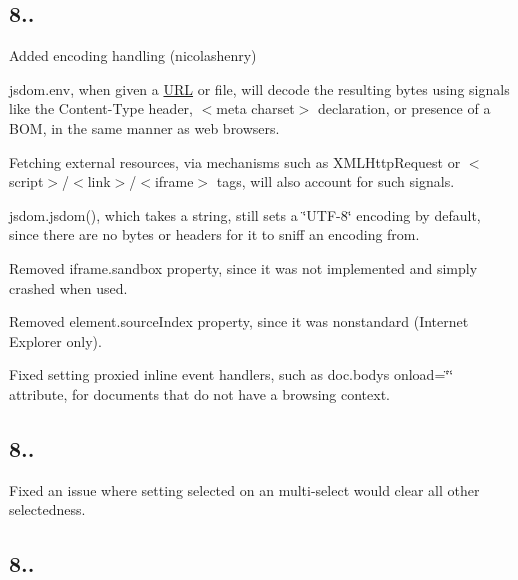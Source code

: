 \subsection*{8..}


\begin{DoxyItemize}
\item Added encoding handling (nicolashenry)
\begin{DoxyItemize}
\item {\ttfamily jsdom.\+env}, when given a \mbox{\hyperlink{namespace_u_r_l}{U\+RL}} or file, will decode the resulting bytes using signals like the {\ttfamily Content-\/\+Type} header, {\ttfamily $<$meta charset$>$} declaration, or presence of a B\+OM, in the same manner as web browsers.
\item Fetching external resources, via mechanisms such as X\+M\+L\+Http\+Request or {\ttfamily $<$script$>$}/{\ttfamily $<$link$>$}/{\ttfamily $<$iframe$>$} tags, will also account for such signals.
\item {\ttfamily jsdom.\+jsdom()}, which takes a string, still sets a \char`\"{}\+U\+T\+F-\/8\char`\"{} encoding by default, since there are no bytes or headers for it to sniff an encoding from.
\end{DoxyItemize}
\item Removed {\ttfamily iframe.\+sandbox} property, since it was not implemented and simply crashed when used.
\item Removed {\ttfamily element.\+source\+Index} property, since it was nonstandard (Internet Explorer only).
\item Fixed setting proxied inline event handlers, such as {\ttfamily doc.\+body}\textquotesingle{}s {\ttfamily onload=\char`\"{}\char`\"{}} attribute, for documents that do not have a browsing context.
\end{DoxyItemize}

\subsection*{8..}


\begin{DoxyItemize}
\item Fixed an issue where setting {\ttfamily selected} on an multi-\/select would clear all other selectedness.
\end{DoxyItemize}

\subsection*{8..}


